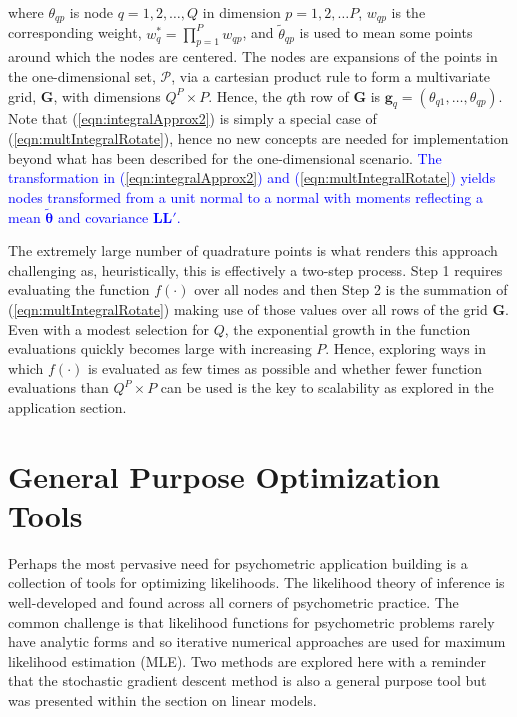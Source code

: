 \documentclass[12pt]{article}
\begin{document}
\noindent where $\theta_{qp}$ is node $q = 1, 2, \ldots, Q$ in dimension $p = 1,2, \ldots P$, $w_{qp}$ is the corresponding weight, $w_q^* = \prod^P_{p=1}w_{qp}$, and $\widetilde{\theta}_{qp}$ is used to mean some points around which the nodes are centered. The nodes are expansions of the points in the one-dimensional set, $\mathcal{P}$, via a cartesian product rule to form a multivariate grid, $\bm{G}$, with dimensions $Q^P\times P$. Hence, the $q$th row of $\bm{G}$ is $\bm{g}_q = (\theta_{q1}, \ldots, \theta_{qp})$.  Note that (\ref{eqn:integralApprox2}) is simply a special case of (\ref{eqn:multIntegralRotate}), hence no new concepts are needed for implementation beyond what has been described for the one-dimensional scenario. \textcolor{blue}{The transformation in (\ref{eqn:integralApprox2}) and (\ref{eqn:multIntegralRotate}) yields nodes transformed from a unit normal to a normal with moments reflecting a mean $\widetilde{\bm{\theta}}$ and covariance $\bm{LL}'$.}

The extremely large number of quadrature points is what renders this approach challenging as, heuristically, this is effectively a two-step process. Step 1 requires evaluating the function $f(\cdot)$ over all nodes and then Step 2 is the summation of (\ref{eqn:multIntegralRotate}) making use of those values over all rows of the grid $\bm{G}$. Even with a modest selection for $Q$, the exponential growth in the function evaluations quickly becomes large with increasing $P$. Hence, exploring ways in which $f(\cdot)$ is evaluated as few times as possible and whether fewer function evaluations than $Q^P\times P$ can be used is the key to scalability as explored in the application section. 

\section*{General Purpose Optimization Tools}

Perhaps the most pervasive need for psychometric application building is a collection of tools for optimizing likelihoods. The likelihood theory of inference is well-developed \cite{king:1998} and found across all corners of psychometric practice. The common challenge is that likelihood functions for psychometric problems rarely have analytic forms and so iterative numerical approaches are used for maximum likelihood estimation (MLE). Two methods are explored here with a reminder that the stochastic gradient descent method is also a general purpose tool but was presented within the section on linear models. 
\end{document}
